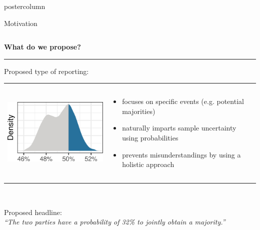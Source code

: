 \documentclass[final,hyperref={pdfpagelabels=false}]{beamer}
\let\olditem\item
\renewcommand\item{\justifying\olditem} %
\newcommand{\bfBlue}[1]{\textcolor{koaladarkestblue}{\textbf{#1}}}
\newcommand{\blue}[1]{\textcolor{koaladarkestblue}{#1}}
\newcommand{\darkgray}[1]{\textcolor{koaladarkgray}{#1}}
\newcommand{\lightgray}[1]{\textcolor{koalagray}{#1}}
\newcommand{\colHeader}[1]{
  \vspace{-3ex}
  \begin{center}\centering
  \bfBlue{#1}
  \end{center}
  \vspace{-2ex}
  \textcolor{koalablue}{\hrule{}}
  \vspace{2ex}
}
\begin{document}
\begin{frame}
\begin{columns}
\begin{column}{1\textwidth}
\begin{beamercolorbox}[center,wd=\textwidth]{postercolumn}
\begin{minipage}[T]{.95\textwidth}
\begin{block}{\footnotesize Motivation}
\begin{columns}[t]

  \begin{column}{.475\textwidth}
  \colHeader{What do we propose?}
  Proposed type of reporting: \\[1cm]
  \begin{tabular}{p{9cm}p{25cm}}
  \includegraphics[height=5cm]{figures/motivation_density_highlighted}
  &
  \vspace{-4.8cm}
  \begin{itemize}
    \item focuses on specific events (e.g. potential majorities)
    \item naturally imparts sample uncertainty using probabilities
    \item prevents misunderstandings by using a holistic approach
  \end{itemize}
  \end{tabular}
  \\[10px]
  \begin{mdleftblue}
  \begin{minipage}{\textwidth}
  \lightgray{\footnotesize Proposed headline:}
  \\
  \vspace{-50px}
  \textit{\darkgray{``The two parties have a} \blue{probability of 32\%} \darkgray{to jointly obtain a majority.''}}
  \\[17px]
  \end{minipage}
  \end{mdleftblue}
  \vspace{60px}


\end{column}
\end{columns}
\end{block}
\end{minipage}
\end{beamercolorbox}
\end{column}
\end{columns}
\end{frame}
\end{document}
